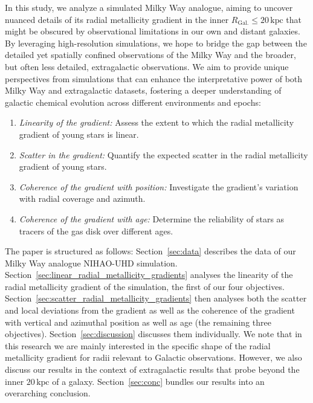 \documentclass[fleqn,usenatbib]{mnras}
\begin{document}
In this study, we analyze a simulated Milky Way analogue, aiming to uncover nuanced details of its radial metallicity gradient in the inner $R_\mathrm{Gal.} \leq 20\,\mathrm{kpc}$ that might be obscured by observational limitations in our own and distant galaxies. By leveraging high-resolution simulations, we hope to bridge the gap between the detailed yet spatially confined observations of the Milky Way and the broader, but often less detailed, extragalactic observations. We aim to provide unique perspectives from simulations that can enhance the interpretative power of both Milky Way and extragalactic datasets, fostering a deeper understanding of galactic chemical evolution across different environments and epochs:
\begin{enumerate}
\item \textit{Linearity of the gradient:} Assess the extent to which the radial metallicity gradient of young stars is linear.
\item \textit{Scatter in the gradient:} Quantify the expected scatter in the radial metallicity gradient of young stars.
\item \textit{Coherence of the gradient with position:} Investigate the gradient's variation with radial coverage and azimuth.
\item \textit{Coherence of the gradient with age:} Determine the reliability of stars as tracers of the gas disk over different ages.
\end{enumerate}

The paper is structured as follows: Section~\ref{sec:data} describes the data of our Milky Way analogue NIHAO-UHD simulation. Section~\ref{sec:linear_radial_metallicity_gradients} analyses the linearity of the radial metallicity gradient of the simulation, the first of our four objectives. Section~\ref{sec:scatter_radial_metallicity_gradients} then analyses both the scatter and local deviations from the gradient as well as the coherence of the gradient with vertical and azimuthal position as well as age (the remaining three objectives). Section~\ref{sec:discussion} discusses them individually. We note that in this research we are mainly interested in the specific shape of the radial metallicity gradient for radii relevant to Galactic observations. However, we also discuss our results in the context of extragalactic results that probe beyond the inner $20\,\mathrm{kpc}$ of a galaxy. Section~\ref{sec:conc} bundles our results into an overarching conclusion. 

\end{document}
